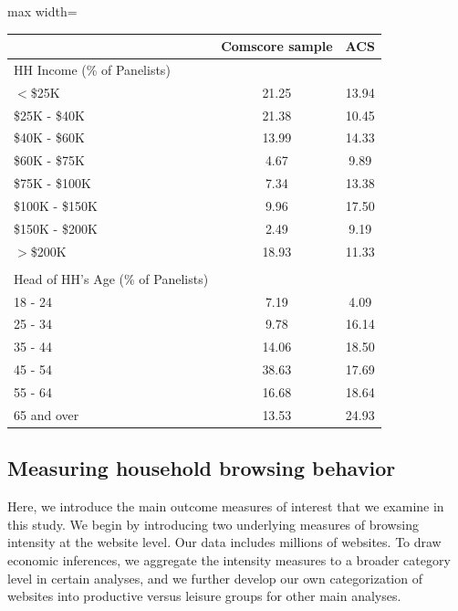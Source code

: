 \documentclass[12pt]{article}
\begin{document}
\begin{table}[htbp]
    \centering
 \begin{adjustbox}{max width=\textwidth}   
\begin{tabular}{@{}lcc@{}}
    \toprule
    \textbf{} & \textbf{Comscore sample} & \textbf{ACS} \\
    \midrule
    HH Income (\% of Panelists) \\ 
    \hspace{3mm} $<$\$25K & 21.25 & 13.94 \\
    \hspace{3mm} \$25K - \$40K & 21.38 & 10.45 \\
    \hspace{3mm} \$40K - \$60K & 13.99 & 14.33 \\
    \hspace{3mm} \$60K - \$75K & 4.67 & 9.89  \\
    \hspace{3mm} \$75K - \$100K & 7.34 & 13.38 \\   
    \hspace{3mm} \$100K - \$150K & 9.96 &  17.50 \\     
    \hspace{3mm} \$150K - \$200K & 2.49 & 9.19 \\       
    \hspace{3mm} $>$\$200K & 18.93 & 11.33 \\
    \\
    Head of HH's Age (\% of Panelists) \\
    \hspace{3mm} 18 - 24 & 7.19 & 4.09 \\
    \hspace{3mm} 25 - 34 & 9.78 & 16.14 \\
    \hspace{3mm} 35 - 44 & 14.06 & 18.50 \\
    \hspace{3mm} 45 - 54 & 38.63 & 17.69 \\
    \hspace{3mm} 55 - 64 & 16.68 & 18.64 \\
    \hspace{3mm} 65 and over & 13.53 & 24.93 \\    
    \bottomrule
    \end{tabular}
\end{adjustbox}
\end{table}


\subsection{Measuring household browsing behavior}
Here, we introduce the main outcome measures of interest that we examine in this study. We begin by introducing two underlying measures of browsing intensity at the website level. Our data includes millions of websites. To draw economic inferences, we aggregate the intensity measures to a broader category level in certain analyses, and we further develop our own categorization of websites into productive versus leisure groups for other main analyses. 
\end{document}
